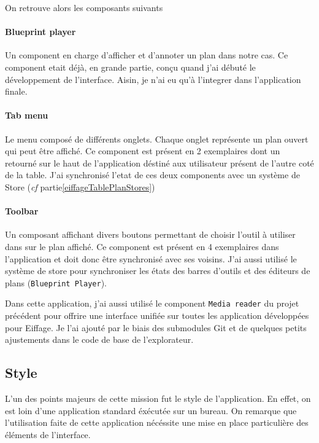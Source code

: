 On retrouve alors les composants suivants

\paragraph{Blueprint player} Un component en charge d'afficher et d'annoter un plan dans notre cas.
Ce component etait déjà, en grande partie, conçu quand j'ai débuté le développement de l'interface.
Aisin, je n'ai eu qu'à l'integrer dans l'application finale.

\paragraph{Tab menu} Le menu composé de différents onglets.
Chaque onglet représente un plan ouvert qui peut être affiché.
Ce component est présent en 2 exemplaires dont un retourné sur le haut de l'application déstiné aux utilisateur présent de l'autre coté de la table.
J'ai synchronisé l'etat de ces deux components avec un système de Store (\emph{cf} partie\ref{eiffageTablePlanStores})

\paragraph{Toolbar} Un composant affichant divers boutons permettant de choisir l'outil à utiliser dans sur le plan affiché.
Ce component est présent en 4 exemplaires dans l'application et doit donc être synchronisé avec ses voisins.
J'ai aussi utilisé le système de store pour synchroniser les états des barres d'outils et des éditeurs de plans (\texttt{Blueprint Player}).

\bigskip

Dans cette application, j'ai aussi utilisé le component \texttt{Media reader} du projet précédent pour offrire une interface unifiée sur toutes les application développées pour Eiffage.
Je l'ai ajouté par le biais des submodules Git et de quelques petits ajustements dans le code de base de l'explorateur.

\subsection{Style}
\label{eiffageTablePlanStyle}

L'un des points majeurs de cette mission fut le style de l'application.
En effet, on est loin d'une application standard éxécutée sur un bureau.
On remarque que l'utilisation faite de cette application nécéssite une mise en place particulière des éléments de l'interface.

